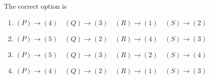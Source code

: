 \documentclass[12pt,a4paper]{article}
\begin{document}
\begin{enumerate}
The correct option is
\begin{enumerate}
    \item $ (P) \to (4) \quad (Q) \to (3) \quad (R) \to (1) \quad (S) \to (2) $
    \item $ (P) \to (5) \quad (Q) \to (2) \quad (R) \to (4) \quad (S) \to (3) $
    \item $ (P) \to (5) \quad (Q) \to (3) \quad (R) \to (2) \quad (S) \to (4) $
    \item $ (P) \to (4) \quad (Q) \to (2) \quad (R) \to (1) \quad (S) \to (3) $
\end{enumerate}
   
\end{enumerate}
\end{document}
